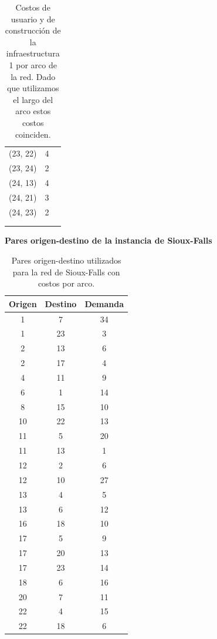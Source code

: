 \documentclass{article}
\begin{document}
\begin{table}[h!]
\begin{tabular}{ccc}
        (23, 22) & 4 \\
        (23, 24) & 2 \\
        (24, 13) & 4 \\
        (24, 21) & 3 \\
        (24, 23) & 2 \\
         & \\
         & \\
      \bottomrule
    \end{tabular}
    \caption{Costos de usuario y de construcción de la infraestructura 1 por arco de la red. Dado que utilizamos el largo del arco estos costos coinciden.}\label{table:siouxfallsgraphdata}
  \end{table}

  \begin{table}[h!]
    \centering
    \caption*{{\bf Pares origen-destino de la instancia de Sioux-Falls}}
    \begin{tabular}{ccc}
      \toprule
        Origen & Destino & Demanda \\
      \midrule
        1 & 7 & 34 \\
        1 & 23 & 3 \\
        2 & 13 & 6 \\
        2 & 17 & 4 \\
        4 & 11 & 9 \\
        6 & 1 & 14 \\
        8 & 15 & 10 \\
        10 & 22 & 13 \\
        11 & 5 & 20 \\
        11 & 13 & 1 \\
        12 & 2 & 6 \\
        12 & 10 & 27 \\
        13 & 4 & 5 \\
        13 & 6 & 12 \\
        16 & 18 & 10 \\
        17 & 5 & 9 \\
        17 & 20 & 13 \\
        17 & 23 & 14 \\
        18 & 6 & 16 \\
        20 & 7 & 11 \\
        22 & 4 & 15 \\
        22 & 18 & 6 \\
      \bottomrule
    \end{tabular}
    \caption{Pares origen-destino utilizados para la red de Sioux-Falls con costos por arco.}\label{table:siouxfallsdemanddata}
  \end{table}

  \FloatBarrier
  \printbibliography
\end{document}
